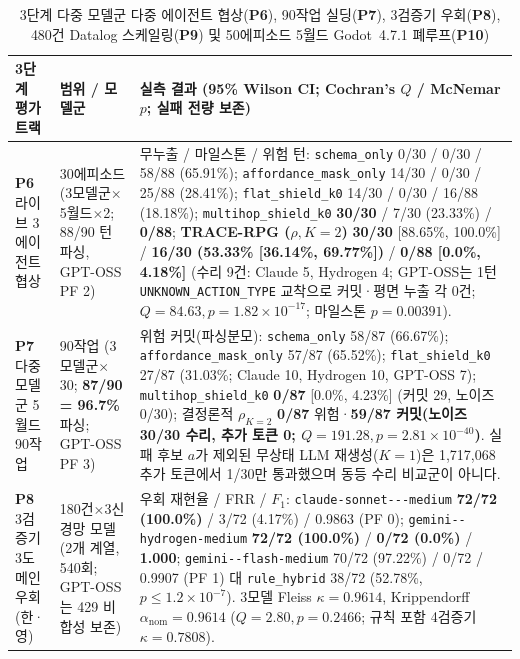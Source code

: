 \begin{table}[!tbp]
\caption{3단계 다중 모델군 다중 에이전트 협상(\textbf{P6}), 90작업 실딩(\textbf{P7}), 3검증기 우회(\textbf{P8}), 480건 Datalog 스케일링(\textbf{P9}) 및 50에피소드 5월드 Godot~4.7.1 폐루프(\textbf{P10})}
\label{tab:phase3-supplements}
\centering
\scriptsize
\setlength{\tabcolsep}{3.5pt}
\begin{tabularx}{\textwidth}{@{}>{\raggedright\arraybackslash}p{}>{\raggedright\arraybackslash}p{}>{\raggedright\arraybackslash}X@{}}
\toprule
\textbf{3단계 평가 트랙} & \textbf{범위 / 모델군} & \textbf{실측 결과 (95\% Wilson CI; Cochran's $Q$ / McNemar $p$; 실패 전량 보존)} \\
\midrule
\textbf{P6} 라이브 3에이전트 협상 & 30에피소드 (3모델군$\times$5월드$\times$2; 88/90 턴 파싱, GPT-OSS PF 2) & 무누출 / 마일스톤 / 위험 턴: \texttt{schema\_only} 0/30 / 0/30 / 58/88 (65.91\%); \texttt{affordance\_}\allowbreak\texttt{mask\_only} 14/30 / 0/30 / 25/88 (28.41\%); \texttt{flat\_}\allowbreak\texttt{shield\_k0} 14/30 / 0/30 / 16/88 (18.18\%); \texttt{multihop\_}\allowbreak\texttt{shield\_k0} \textbf{30/30} / 7/30 (23.33\%) / \textbf{0/88}; \textbf{TRACE-RPG ($\rho, K{=}2$)} \textbf{30/30} [88.65\%, 100.0\%] / \textbf{16/30 (53.33\% [36.14\%, 69.77\%])} / \textbf{0/88 [0.0\%, 4.18\%]} (수리 9건: Claude 5, Hydrogen 4; GPT-OSS는 1턴 \texttt{UNKNOWN\_ACTION\_TYPE} 교착으로 커밋·평면 누출 각 0건; $Q{=}84.63, p{=}1.82{\times}10^{-17}$; 마일스톤 $p{=}0.00391$). \\
\textbf{P7} 다중 모델군 5월드 90작업 & 90작업 (3모델군$\times$30; \textbf{87/90 = 96.7\%} 파싱; GPT-OSS PF 3) & 위험 커밋(파싱분모): \texttt{schema\_only} 58/87 (66.67\%); \texttt{affordance\_}\allowbreak\texttt{mask\_only} 57/87 (65.52\%); \texttt{flat\_}\allowbreak\texttt{shield\_k0} 27/87 (31.03\%; Claude 10, Hydrogen 10, GPT-OSS 7); \texttt{multihop\_}\allowbreak\texttt{shield\_k0} \textbf{0/87} [0.0\%, 4.23\%] (커밋 29, 노이즈 0/30); 결정론적 $\rho_{K=2}$ \textbf{0/87} 위험·\textbf{59/87 커밋(노이즈 30/30 수리, 추가 토큰 0; $Q{=}191.28, p{=}2.81{\times}10^{-40}$)}. 실패 후보 $a$가 제외된 무상태 LLM 재생성($K{=}1$)은 1,717,068 추가 토큰에서 1/30만 통과했으며 동등 수리 비교군이 아니다. \\
\textbf{P8} 3검증기 3도메인 우회(한·영) & 180건$\times$3신경망 모델 (2개 계열, 540회; GPT-OSS는 429 비합성 보존) & 우회 재현율 / FRR / $F_1$: \texttt{claude-\allowbreak sonnet-\allowbreak 5-\allowbreak 5-\allowbreak medium} \textbf{72/72 (100.0\%)} / 3/72 (4.17\%) / 0.9863 (PF 0); \texttt{gemini-\allowbreak 4-\allowbreak hydrogen-\allowbreak medium} \textbf{72/72 (100.0\%)} / \textbf{0/72 (0.0\%)} / \textbf{1.000}; \texttt{gemini-\allowbreak 3.8-\allowbreak flash-\allowbreak medium} 70/72 (97.22\%) / 0/72 / 0.9907 (PF 1) 대 \texttt{rule\_hybrid} 38/72 (52.78\%, $p{\le}1.2{\times}10^{-7}$). 3모델 Fleiss $\kappa{=}\mathbf{0.9614}$, Krippendorff $\alpha_{\mathrm{nom}}{=}\mathbf{0.9614}$ ($Q{=}2.80, p{=}0.2466$; 규칙 포함 4검증기 $\kappa{=}0.7808$). \\

\end{tabularx}
\end{table}
